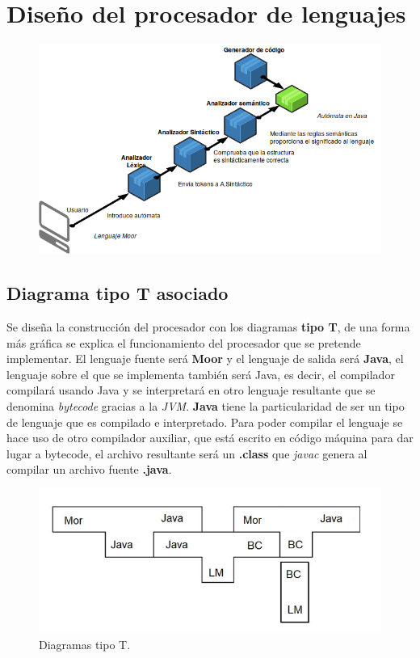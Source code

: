 \documentclass[12pt,a4paper]{article}
\begin{document}
\section{Diseño del procesador de lenguajes}
\begin{figure}[h]
	\centering
	\includegraphics[width=0.7\linewidth]{img/disenio}
	\caption{}
	\label{fig:disenio}
\end{figure}

\clearpage

\subsection{Diagrama tipo T asociado}
Se diseña la construcción del procesador con los diagramas \textbf{tipo T}, de una forma más gráfica se explica el funcionamiento del procesador que se pretende implementar.\newline
El lenguaje fuente será \textbf{Moor} y el lenguaje de salida será \textbf{Java}, el lenguaje sobre el que se implementa también será Java, es decir, el compilador compilará usando Java y se interpretará en otro lenguaje resultante que se denomina \textit{bytecode} gracias a la \textit{JVM}.\newline \newline
\textbf{Java} tiene la particularidad de ser un tipo de lenguaje que es compilado e interpretado.
\newline
Para poder compilar el lenguaje se hace uso de otro compilador auxiliar, que está escrito en código máquina para dar lugar a bytecode, el archivo resultante será un \textbf{.class} que \textit{javac} genera al compilar un archivo fuente \textbf{.java}.
\newline

	\begin{figure}[h]
		\centering
		\includegraphics[width=0.7
		\linewidth]{img/T.png}
		\caption{Diagramas tipo T.}
		\label{fig:modelo-moore}
	\end{figure}
\end{document}
